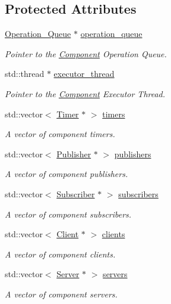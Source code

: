 \subsection*{Protected Attributes}
\begin{DoxyCompactItemize}
\item 
\hyperlink{classzcm_1_1Operation__Queue}{Operation\+\_\+\+Queue} $\ast$ \hyperlink{classzcm_1_1Component_a4c9f3591c18dde89bc3c2af7717c6692}{operation\+\_\+queue}
\begin{DoxyCompactList}\small\item\em Pointer to the \hyperlink{classzcm_1_1Component}{Component} Operation Queue. \end{DoxyCompactList}\item 
std\+::thread $\ast$ \hyperlink{classzcm_1_1Component_a392ca3b6cd537cd7aa1d4db31dacdf4d}{executor\+\_\+thread}
\begin{DoxyCompactList}\small\item\em Pointer to the \hyperlink{classzcm_1_1Component}{Component} Executor Thread. \end{DoxyCompactList}\item 
std\+::vector$<$ \hyperlink{classzcm_1_1Timer}{Timer} $\ast$ $>$ \hyperlink{classzcm_1_1Component_a506eac4aebc9e02f0df246afbbac7d75}{timers}
\begin{DoxyCompactList}\small\item\em A vector of component timers. \end{DoxyCompactList}\item 
std\+::vector$<$ \hyperlink{classzcm_1_1Publisher}{Publisher} $\ast$ $>$ \hyperlink{classzcm_1_1Component_a4dcce63b0b5495bc15bd18e5dce86094}{publishers}
\begin{DoxyCompactList}\small\item\em A vector of component publishers. \end{DoxyCompactList}\item 
std\+::vector$<$ \hyperlink{classzcm_1_1Subscriber}{Subscriber} $\ast$ $>$ \hyperlink{classzcm_1_1Component_a9f9e58fb5d2189b183ffd22ce905d620}{subscribers}
\begin{DoxyCompactList}\small\item\em A vector of component subscribers. \end{DoxyCompactList}\item 
std\+::vector$<$ \hyperlink{classzcm_1_1Client}{Client} $\ast$ $>$ \hyperlink{classzcm_1_1Component_a940e1b9755cd9f2bea95bda880999626}{clients}
\begin{DoxyCompactList}\small\item\em A vector of component clients. \end{DoxyCompactList}\item 
std\+::vector$<$ \hyperlink{classzcm_1_1Server}{Server} $\ast$ $>$ \hyperlink{classzcm_1_1Component_a1d99508f165f7014b190d2fbe4ad2271}{servers}
\begin{DoxyCompactList}\small\item\em A vector of component servers. \end{DoxyCompactList}\end{DoxyCompactItemize}


